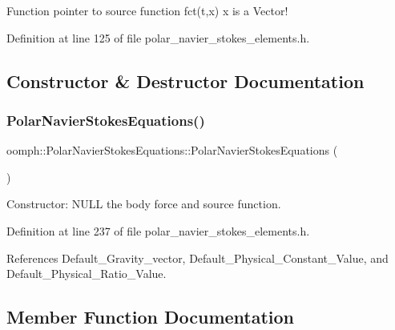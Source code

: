 Function pointer to source function fct(t,x) x is a Vector! 



Definition at line 125 of file polar\+\_\+navier\+\_\+stokes\+\_\+elements.\+h.



\subsection{Constructor \& Destructor Documentation}
\mbox{\label{classoomph_1_1PolarNavierStokesEquations_a01afefd52f1b684325bcb13e26e6445c}} 
\subsubsection{\texorpdfstring{Polar\+Navier\+Stokes\+Equations()}{PolarNavierStokesEquations()}}
{\footnotesize\ttfamily oomph\+::\+Polar\+Navier\+Stokes\+Equations\+::\+Polar\+Navier\+Stokes\+Equations (\begin{DoxyParamCaption}{ }\end{DoxyParamCaption})\hspace{0.3cm}{\ttfamily [inline]}}



Constructor\+: N\+U\+LL the body force and source function. 



Definition at line 237 of file polar\+\_\+navier\+\_\+stokes\+\_\+elements.\+h.



References Default\+\_\+\+Gravity\+\_\+vector, Default\+\_\+\+Physical\+\_\+\+Constant\+\_\+\+Value, and Default\+\_\+\+Physical\+\_\+\+Ratio\+\_\+\+Value.



\subsection{Member Function Documentation}
\mbox{\label{classoomph_1_1PolarNavierStokesEquations_a4bde38e6f8a429c4e3da7c3ce273045e}} 

